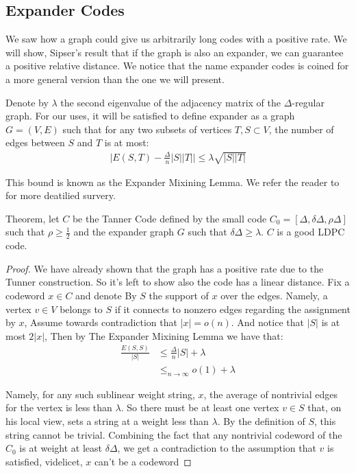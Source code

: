   \subsection{Expander Codes}
  We saw how a graph could give us arbitrarily long codes with a positive rate. We will show, Sipser's result \cite{ExpanderCodes} that if the graph is also an expander, we can guarantee a positive relative distance. We notice that the name expander codes is coined for a more general version than the one we will present.   
  \begin{definition} Denote by $\lambda$ the second eigenvalue of the adjacency matrix of the $\Delta$-regular graph. For our uses, it will be satisfied to define expander as a graph $G = \left( V,E \right)$ such that for any two subsets of vertices $T,S \subset V$, the number of edges between $S$ and $T$ is at most:
  \begin{equation*}
    \begin{split}
      \mid E\left( S,T \right) - \frac{\Delta}{n}|S||T| \mid \le \lambda\sqrt{|S| |T|} 
    \end{split}
  \end{equation*}
\end{definition}
This bound is known as the Expander Mixining Lemma. We refer the reader to \cite{hoory2006expander} for more deatilied survery. 
  \begin{theorem*} Theorem, let $C$ be the Tanner Code defined by the small code $C_{0} = [\Delta,\delta\Delta, \rho\Delta ]$ such that $\rho \ge \frac{1}{2}$ and the expander graph $G$ such that $\delta\Delta \ge \lambda$. $C$ is a good  LDPC code.
  \end{theorem*}
  \begin{proof} We have already shown that the graph has a positive rate due to the Tunner construction. So it's left to show also the code has a linear distance. Fix a codeword $x \in C$ and denote By $S$ the support of $x$ over the edges. Namely, a vertex $v\in V$ belongs to $S$ if it connects to nonzero edges regarding the assignment by $x$, Assume towards contradiction that $|x| = o\left( n \right)$. And notice that $|S|$ is at most $2|x|$, Then by The Expander Mixining Lemma we have that: 
  \begin{equation*}
    \begin{split}
      \frac{E\left( S,S \right)}{|S|} & \le \frac{\Delta}{n}|S|  + \lambda \\
      & \le_{ n \rightarrow \infty} o\left( 1 \right) + \lambda
    \end{split}
  \end{equation*}

  Namely, for any such sublinear weight string, $x$, the average of nontrivial edges for the vertex is less than $\lambda$. So there must be at least one vertex $v \in S$ that, on his local view, sets a  string at a weight less than $\lambda$. By the definition of $S$, this string cannot be trivial. Combining the fact that any nontrivial codeword of the $C_{0}$ is at weight at least $\delta\Delta$, we get a contradiction to the assumption that $v$ is satisfied, videlicet, $x$ can't be a codeword \end{proof}

